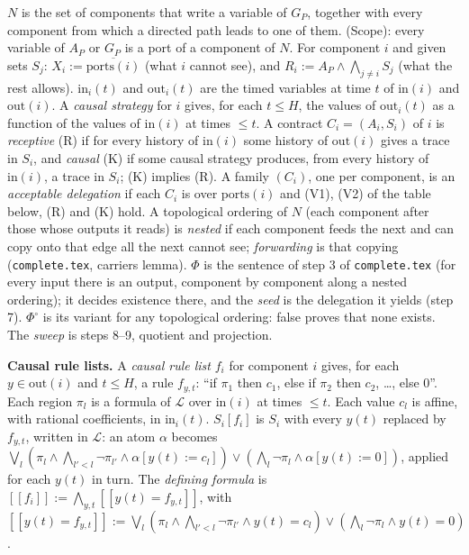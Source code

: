 \documentclass[10pt]{article}
\theoremstyle{tplain}\newtheorem{theorem}{Theorem}\newtheorem{lemma}[theorem]{Lemma}\newtheorem{proposition}[theorem]{Proposition}\newtheorem{corollary}[theorem]{Corollary}\newtheorem{claim}[theorem]{Claim}
\theoremstyle{tdef}\newtheorem{definition}[theorem]{Definition}
\newcommand{\inp}{\mathrm{in}}\newcommand{\outp}{\mathrm{out}}\newcommand{\ports}{\mathrm{ports}}
\newcommand{\df}[1]{[\![#1]\!]}\newcommand{\hid}[1]{\overline{#1}}
\begin{document}
$N$ is the set of components that write a variable of $G_P$, together with every component from which a directed path leads to one of them. (Scope): every variable of $A_P$ or $G_P$ is a port of a component of $N$. For component $i$ and given sets $S_j$: $X_i:=\hid{\ports(i)}$ (what $i$ cannot see), and $R_i:=A_P\wedge\bigwedge_{j\ne i}S_j$ (what the rest allows). $\inp_i(t)$ and $\outp_i(t)$ are the timed variables at time $t$ of $\inp(i)$ and $\outp(i)$. A \emph{causal strategy} for $i$ gives, for each $t\le H$, the values of $\outp_i(t)$ as a function of the values of $\inp(i)$ at times $\le t$. A contract $C_i=(A_i,S_i)$ of $i$ is \emph{receptive} (R) if for every history of $\inp(i)$ some history of $\outp(i)$ gives a trace in $S_i$, and \emph{causal} (K) if some causal strategy produces, from every history of $\inp(i)$, a trace in $S_i$; (K) implies (R). A family $(C_i)$, one per component, is an \emph{acceptable delegation} if each $C_i$ is over $\ports(i)$ and (V1), (V2) of the table below, (R) and (K) hold. A topological ordering of $N$ (each component after those whose outputs it reads) is \emph{nested} if each component feeds the next and can copy onto that edge all the next cannot see; \emph{forwarding} is that copying (\texttt{complete.tex}, carriers lemma). $\Phi$ is the sentence of step 3 of \texttt{complete.tex} (for every input there is an output, component by component along a nested ordering); it decides existence there, and the \emph{seed} is the delegation it yields (step 7). $\Phi^\circ$ is its variant for any topological ordering: false proves that none exists. The \emph{sweep} is steps 8--9, quotient and projection.

\textbf{Causal rule lists.} A \emph{causal rule list} $f_i$ for component $i$ gives, for each $y\in\outp(i)$ and $t\le H$, a rule $f_{y,t}$: ``if $\pi_1$ then $c_1$, else if $\pi_2$ then $c_2$, \dots, else $0$''. Each region $\pi_l$ is a formula of $\mathcal L$ over $\inp(i)$ at times $\le t$. Each value $c_l$ is affine, with rational coefficients, in $\inp_i(t)$. $S_i[f_i]$ is $S_i$ with every $y(t)$ replaced by $f_{y,t}$, written in $\mathcal L$: an atom $\alpha$ becomes $\bigvee_l(\pi_l\wedge\bigwedge_{l'<l}\neg\pi_{l'}\wedge\alpha[y(t):=c_l])\vee(\bigwedge_l\neg\pi_l\wedge\alpha[y(t):=0])$, applied for each $y(t)$ in turn. The \emph{defining formula} is $\df{f_i}:=\bigwedge_{y,t}\df{y(t)=f_{y,t}}$, with $\df{y(t)=f_{y,t}}:=\bigvee_l(\pi_l\wedge\bigwedge_{l'<l}\neg\pi_{l'}\wedge y(t)=c_l)\vee(\bigwedge_l\neg\pi_l\wedge y(t)=0)$.
\end{document}

